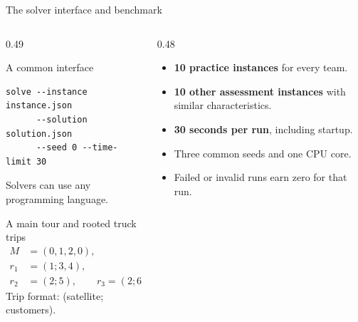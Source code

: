 \documentclass[table]{customIMTbeamer/imt_pres}
\begin{document}
\begin{frame}[fragile]{The solver interface and benchmark}
\begin{columns}[T,onlytextwidth]
\begin{column}{0.49\textwidth}
\begin{block}{A common interface}
\begin{lstlisting}
solve --instance instance.json
      --solution solution.json
      --seed 0 --time-limit 30
\end{lstlisting}
Solvers can use any programming language.
\end{block}
\begin{exampleblock}{A main tour and rooted truck trips}
\[
\begin{aligned}
M&=(0,1,2,0),\\
r_1&=(1;3,4),\\
r_2&=(2;5),\qquad r_3=(2;6).
\end{aligned}
\]
Trip format: (satellite; customers).
\end{exampleblock}
\end{column}
\begin{column}{0.48\textwidth}
\begin{itemize}
\item \textbf{10 practice instances} for every team.
\item \textbf{10 other assessment instances} with similar characteristics.
\item \textbf{30 seconds per run}, including startup.
\item Three common seeds and one CPU core.
\item Failed or invalid runs earn zero for that run.
\end{itemize}
\end{column}
\end{columns}
\end{frame}
\end{document}
